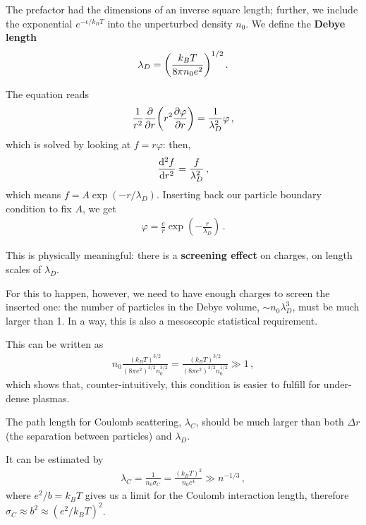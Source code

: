 \documentclass[main.tex]{subfiles}
\begin{document}
The prefactor had the dimensions of an inverse square length; further, we include the exponential \(e^{- \epsilon / k_BT}\) into the unperturbed density \(n_0 \).
We define the \textbf{Debye length}
%
\begin{align}
\lambda _D = \qty(\frac{k_B T}{8 \pi n_0 e^2})^{1/2}
\,.
\end{align}

The equation reads 
%
\begin{align}
\frac{1}{r^2} \pdv{r} \qty(r^2 \pdv{\varphi }{r}) 
= \frac{1}{\lambda _D^2} \varphi 
\,,
\end{align}
%
which is solved by looking at \(f = r \varphi \): then, 
%
\begin{align}
\dv[2]{f}{r} = \frac{f}{\lambda _D^2}
\,,
\end{align}
%
which means \(f = A \exp(- r / \lambda _D)\). 
Inserting back our particle boundary condition to fix \(A\), we get 
%
\begin{align}
\varphi = \frac{e}{r} \exp(- \frac{r}{\lambda _D})
\,.
\end{align}

This is physically meaningful: there is a \textbf{screening effect} on charges, on length scales of \(\lambda _D\). 

For this to happen, however, we need to have enough charges to screen the inserted one: the number of particles in the Debye volume, \(\sim n_0 \lambda _D^3\), must be much larger than 1. 
In a way, this is also a mesoscopic statistical requirement. 

This can be written as 
%
\begin{align}
n_0 \frac{(k_BT)^{3/2}}{( 8 \pi e^2)^{3/2} n_0^{3/2}} 
= \frac{(k_BT)^{3/2}}{( 8 \pi e^2)^{3/2} n_0^{1/2}} 
\gg 1
\,,
\end{align}
%
which shows that, counter-intuitively, this condition is easier to fulfill for under-dense plasmas. 

The path length for Coulomb scattering, \(\lambda _C\), should be much larger than both \(\Delta r\) (the separation between particles) and \(\lambda _D\). 

It can be estimated by 
%
\begin{align}
\lambda _C = \frac{1}{n_0 \sigma _C} = \frac{(k_B T)^2}{n_0 e^{4}} \gg n^{-1/3} 
\,,
\end{align}
%
where \(e^2 / b = k_B T\) gives us a limit for the Coulomb interaction length, therefore \(\sigma _C \approx b^2 \approx (e^2 / k_B T)^2\). 

\end{document}
